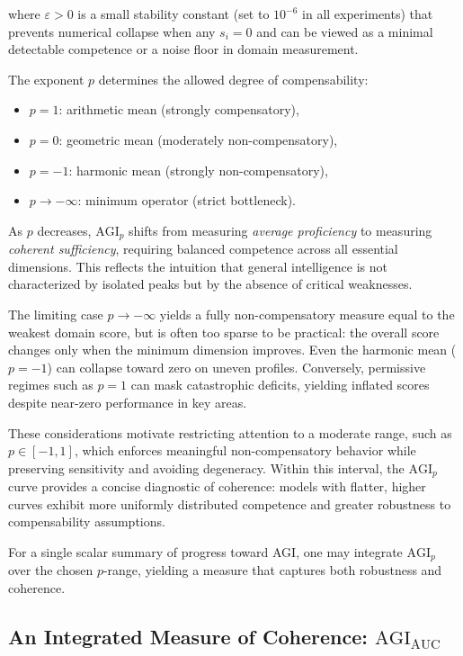 \documentclass{article}
\begin{document}
where $\varepsilon>0$ is a small stability constant (set to $10^{-6}$ in all experiments) that prevents
numerical collapse when any $s_i = 0$ and can be viewed as a minimal detectable competence or a noise floor in domain measurement.  

The exponent $p$ determines the allowed degree of compensability:
\begin{itemize}
    \item $p = 1$: arithmetic mean (strongly compensatory),
    \item $p = 0$: geometric mean (moderately non-compensatory),
    \item $p = -1$: harmonic mean (strongly non-compensatory),
    \item $p \to -\infty$: minimum operator (strict bottleneck).
\end{itemize}

As $p$ decreases, $\mathrm{AGI}_p$ shifts from measuring \emph{average proficiency} to measuring \emph{coherent sufficiency}, requiring balanced competence across all essential dimensions. This reflects the intuition that general intelligence is not characterized by isolated peaks but by the absence of critical weaknesses.

The limiting case $p \to -\infty$ yields a fully non-compensatory measure equal to the weakest domain score, but is often too sparse to be practical: the overall score changes only when the minimum dimension improves. Even the harmonic mean ($p=-1$) can collapse toward zero on uneven profiles. Conversely, permissive regimes such as $p=1$ can mask catastrophic deficits, yielding inflated scores despite near-zero performance in key areas.

These considerations motivate restricting attention to a moderate range, such as $p \in [-1,1]$, which enforces meaningful non-compensatory behavior while preserving sensitivity and avoiding degeneracy. Within this interval, the $\mathrm{AGI}_p$ curve provides a concise diagnostic of coherence: models with flatter, higher curves exhibit more uniformly distributed competence and greater robustness to compensability assumptions.

For a single scalar summary of progress toward AGI, one may integrate $\mathrm{AGI}_p$ over the chosen $p$-range, yielding a measure that captures both robustness and coherence.

\subsection{An Integrated Measure of Coherence: \texorpdfstring{$\mathrm{AGI}_{\mathrm{AUC}}$}{AGI AUC}}
\end{document}
